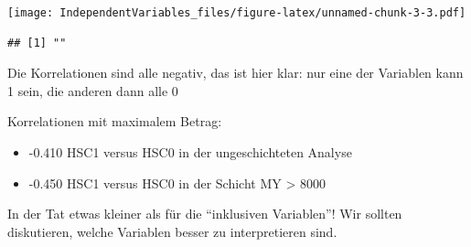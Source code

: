 \documentclass[
]{article}
\providecommand{\tightlist}{%
  \setlength{\itemsep}{0pt}\setlength{\parskip}{0pt}}
\begin{document}
\texttt{[image: IndependentVariables\_files/figure-latex/unnamed-chunk-3-3.pdf]}

\begin{verbatim}
## [1] ""
\end{verbatim}

Die Korrelationen sind alle negativ, das ist hier klar: nur eine der
Variablen kann 1 sein, die anderen dann alle 0

Korrelationen mit maximalem Betrag:

\begin{itemize}
\tightlist
\item
  -0.410 HSC1 versus HSC0 in der ungeschichteten Analyse
\item
  -0.450 HSC1 versus HSC0 in der Schicht MY \textgreater{} 8000
\end{itemize}

In der Tat etwas kleiner als für die ``inklusiven Variablen''! Wir
sollten diskutieren, welche Variablen besser zu interpretieren sind.
\end{document}

